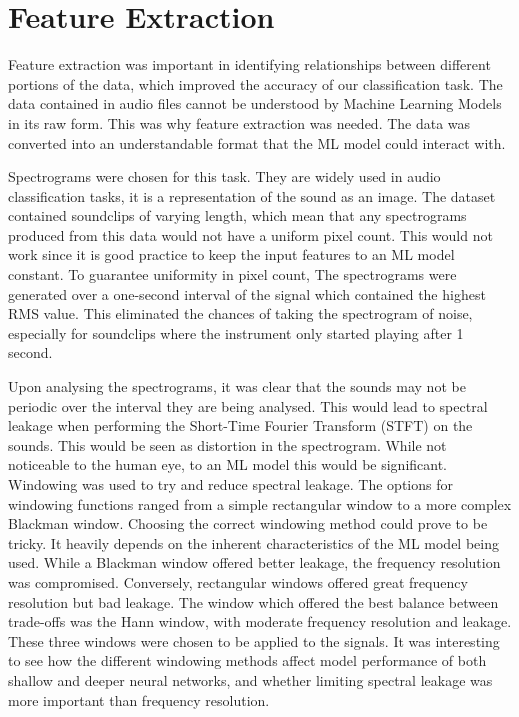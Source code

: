 % 
% 
% 
\section{Feature Extraction \label{ch:Feature_Extraction}}
\vspace{0.5cm}

Feature extraction was important in identifying relationships between different portions of the data, which improved the accuracy of our classification task. The data contained in audio files cannot be understood by Machine Learning Models in its raw form. This was why feature extraction was needed. The data was converted into an understandable format that the ML model could interact with. 

Spectrograms were chosen for this task. They are widely used in audio classification tasks, it is a representation of the sound as an image. The dataset contained soundclips of varying length, which mean that any spectrograms produced from this data would not have a uniform pixel count. This would not work since it is good practice to keep the input features to an ML model constant. To guarantee uniformity in pixel count, The spectrograms were generated over a one-second interval of the signal which contained the highest RMS value. This eliminated the chances of taking the spectrogram of noise, especially for soundclips where the instrument only started playing after 1 second. 

Upon analysing the spectrograms, it was clear that the sounds may not be periodic over the interval they are being analysed. This would lead to spectral leakage when performing the Short-Time Fourier Transform (STFT) on the sounds. This would be seen as distortion in the spectrogram. While not noticeable to the human eye, to an ML model this would be significant. Windowing was used to try and reduce spectral leakage. The options for windowing functions ranged from a simple rectangular window to a more complex Blackman window. Choosing the correct windowing method could prove to be tricky. It heavily depends on the inherent characteristics of the ML model being used. While a Blackman window offered better leakage, the frequency resolution was compromised. Conversely, rectangular windows offered great frequency resolution but bad leakage. The window which offered the best balance between trade-offs was the Hann window, with moderate frequency resolution and leakage. These three windows were chosen to be applied to the signals. It was interesting to see how the different windowing methods affect model performance of both shallow and deeper neural networks, and whether limiting spectral leakage was more important than frequency resolution. 

